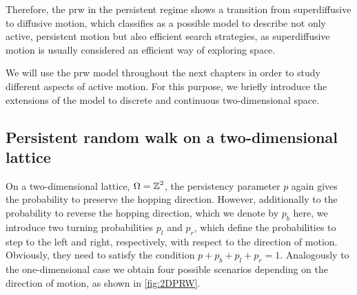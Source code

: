 Therefore, the \ac{prw} in the persistent regime shows a transition from superdiffusive to diffusive motion, which classifies as a possible model to describe not only active, persistent motion but also efficient search strategies, as superdiffusive motion is usually considered an efficient way of exploring space.

We will use the \ac{prw} model throughout the next chapters in order to study different aspects of active motion. For this purpose, we briefly introduce the extensions of the model to discrete and continuous two-dimensional space.

\subsection{Persistent random walk on a two-dimensional lattice} \label{ssec:2d-lattice}
On a two-dimensional lattice, \ie $\Omega = \operatorname{\mathbb{Z}}^2$, the persistency parameter $p$ again gives the probability to preserve the hopping direction. However, additionally to the probability to reverse the hopping direction, which we denote by $p_b$ here, we introduce two turning probabilities $p_l$ and $p_r$, which define the probabilities to step to the left and right, respectively, with respect to the direction of motion. Obviously, they need to satisfy the condition $p + p_b + p_l + p_r = 1$. Analogously to the one-dimensional case we obtain four possible scenarios depending on the direction of motion, as shown in \autoref{fig:2DPRW}.

